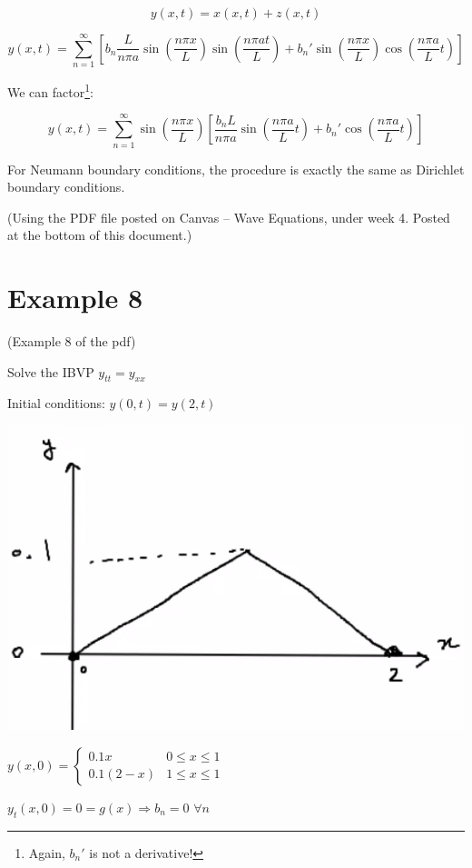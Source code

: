 \documentclass{article}
\begin{document}
$$y(x,t) = x(x,t) + z(x,t)$$

$$ y(x,t) = \sum_{n = 1}^\infty \left[ b_n \frac{L}{n \pi a} \sin \left( \frac{n \pi x}{L} \right) \sin \left( \frac{n \pi a t}{L} \right) + b_n' \sin \left( \frac{n \pi x}{L} \right) \cos \left( \frac{n \pi a}{L} t \right) \right]$$

We can factor\footnote{Again, $b_n'$ is not a derivative!}:

$$y(x,t) = \sum_{n = 1}^\infty \sin \left( \frac{n \pi x}{L} \right) \left[ \frac{b_n L}{n \pi a} \sin \left( \frac{n \pi a}{L}  t \right) + b_n' \cos \left( \frac{n \pi a}{L}  t \right) \right]$$

\hfill

For Neumann boundary conditions, the procedure is exactly the same as Dirichlet boundary conditions. 

(Using the PDF file posted on Canvas -- Wave Equations, under week 4. Posted at the bottom of this document.)

\section{Example 8}

(Example 8 of the pdf)

Solve the IBVP $y_{tt} = y_{xx}$

Initial conditions: $y(0,t) = y(2,t)$

\includegraphics[width = 0.8 \textwidth]{image2.png}

$y(x,0) = \left\{ \begin{matrix} 0.1 x & 0 \leq x \leq 1 \\ 0.1(2-x) & 1 \leq x \leq 1 \end{matrix} \right.$

$y_t (x,0) = 0 = g(x) \Rightarrow b_n = 0$ $ \forall n$
\end{document}
